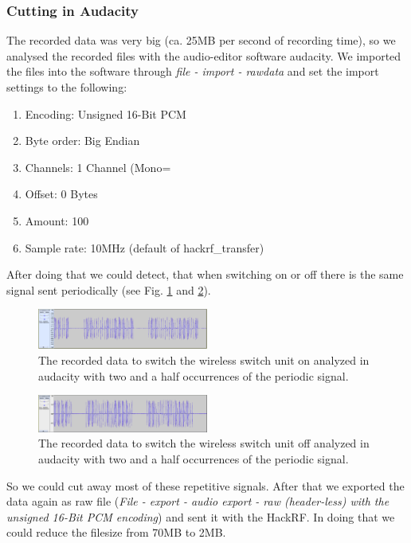 \documentclass[conference]{IEEEtran}
\begin{document}
\subsubsection{Cutting in Audacity}
The recorded data was very big (ca. 25MB per second of recording time), so we analysed the recorded files with the audio-editor software audacity. We imported the files into the software through \textit{file - import - rawdata} and set the import settings to the following:

\begin{enumerate}
	\item Encoding: Unsigned 16-Bit PCM
	\item Byte order: Big Endian
	\item Channels: 1 Channel (Mono=
	\item Offset: 0 Bytes
	\item Amount: 100%
	\item Sample rate: 10MHz (default of hackrf\_transfer)
\end{enumerate}
\bigbreak
After doing that we could detect, that when switching on or off there is the same signal sent periodically (see Fig. \ref{fig:audacity_on} and \ref{fig:audacity_off}). 

\begin{figure}[H]
	\centering
	\includegraphics[width=0.5\textwidth]{audacity_received_on}
	\caption{The recorded data to switch the wireless switch unit on analyzed in audacity with two and a half occurrences of the periodic signal.}
	\label{fig:audacity_on}
\end{figure}

\begin{figure}[H]
	\centering
	\includegraphics[width=0.5\textwidth]{audacity_received_off}
	\caption{The recorded data to switch the wireless switch unit off analyzed in audacity with two and a half occurrences of the periodic signal.}
	\label{fig:audacity_off}
\end{figure}

So we could cut away most of these repetitive signals. After that we exported the data again as raw file (\textit{File - export - audio export - raw (header-less) with the unsigned 16-Bit PCM encoding}) and sent it with the HackRF. In doing that we could reduce the filesize from 70MB to 2MB.



\end{document}
